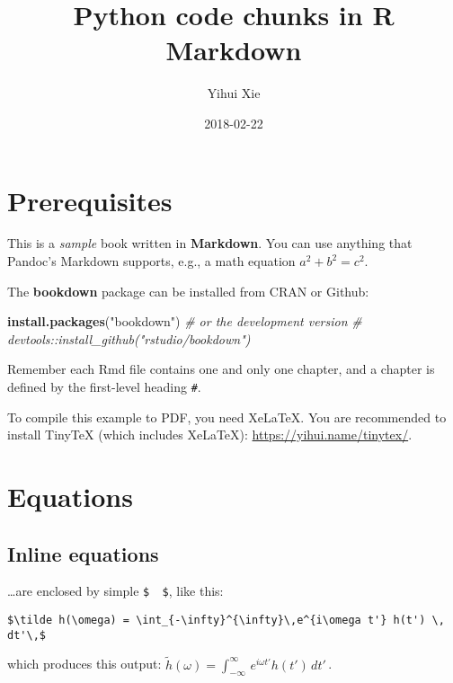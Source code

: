 \documentclass[
]{book}
\title{Python code chunks in R Markdown}
\author{Yihui Xie}
\date{2018-02-22}
\newenvironment{Shaded}{\begin{snugshade}}{\end{snugshade}}
\newcommand{\CommentTok}[1]{\textcolor[rgb]{0.56,0.35,0.01}{\textit{#1}}}
\newcommand{\KeywordTok}[1]{\textcolor[rgb]{0.13,0.29,0.53}{\textbf{#1}}}
\newcommand{\NormalTok}[1]{#1}
\newcommand{\StringTok}[1]{\textcolor[rgb]{0.31,0.60,0.02}{#1}}
\begin{document}
\maketitle

{
\setcounter{tocdepth}{1}
\tableofcontents
}
\hypertarget{prerequisites}{%
\chapter{Prerequisites}\label{prerequisites}}

This is a \emph{sample} book written in \textbf{Markdown}. You can use anything that Pandoc's Markdown supports, e.g., a math equation \(a^2 + b^2 = c^2\).

The \textbf{bookdown} package can be installed from CRAN or Github:

\begin{Shaded}
\begin{Highlighting}[]
\KeywordTok{install.packages}\NormalTok{(}\StringTok{"bookdown"}\NormalTok{)}
\CommentTok{\# or the development version}
\CommentTok{\# devtools::install\_github("rstudio/bookdown")}
\end{Highlighting}
\end{Shaded}

Remember each Rmd file contains one and only one chapter, and a chapter is defined by the first-level heading \texttt{\#}.

To compile this example to PDF, you need XeLaTeX. You are recommended to install TinyTeX (which includes XeLaTeX): \url{https://yihui.name/tinytex/}.

\hypertarget{equations}{%
\chapter{Equations}\label{equations}}

\hypertarget{inline-equations}{%
\section{Inline equations}\label{inline-equations}}

\ldots are enclosed by simple \texttt{\$\ \ \$}, like this:

\begin{verbatim}
$\tilde h(\omega) = \int_{-\infty}^{\infty}\,e^{i\omega t'} h(t') \, dt'\,$
\end{verbatim}

which produces this output: \(\tilde h(\omega) = \int_{-\infty}^{\infty}\,e^{i\omega t'} h(t') \, dt'\,\).
\end{document}
